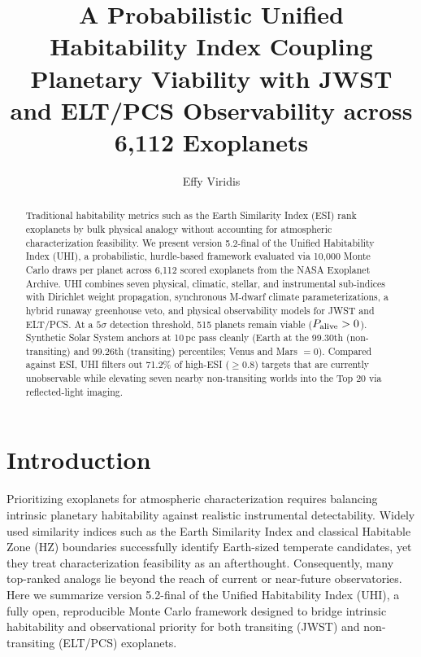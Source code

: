 \documentclass[linenumbers]{aastex702}
\begin{document}
\title{A Probabilistic Unified Habitability Index Coupling Planetary Viability with JWST and ELT/PCS Observability across 6,112 Exoplanets}

\author[0009-0004-5620-5352,gname=Effy,sname=Viridis]{Effy Viridis}

\begin{abstract}
Traditional habitability metrics such as the Earth Similarity Index (ESI) rank exoplanets by bulk physical analogy without accounting for atmospheric characterization feasibility. We present version 5.2-final of the Unified Habitability Index (UHI), a probabilistic, hurdle-based framework evaluated via 10,000 Monte Carlo draws per planet across 6,112 scored exoplanets from the NASA Exoplanet Archive. UHI combines seven physical, climatic, stellar, and instrumental sub-indices with Dirichlet weight propagation, synchronous M-dwarf climate parameterizations, a hybrid runaway greenhouse veto, and physical observability models for JWST and ELT/PCS. At a $5\sigma$ detection threshold, 515 planets remain viable ($P_{\rm alive} > 0$). Synthetic Solar System anchors at 10\,pc pass cleanly (Earth at the 99.30th (non-transiting) and 99.26th (transiting) percentiles; Venus and Mars $= 0$). Compared against ESI, UHI filters out 71.2\% of high-ESI ($\geq 0.8$) targets that are currently unobservable while elevating seven nearby non-transiting worlds into the Top 20 via reflected-light imaging.
\end{abstract}


\section{Introduction}

Prioritizing exoplanets for atmospheric characterization requires balancing intrinsic planetary habitability against realistic instrumental detectability. Widely used similarity indices such as the Earth Similarity Index \citep[ESI;][]{SchulzeMakuch2011} and classical Habitable Zone (HZ) boundaries \citep{Kopparapu2013,Kopparapu2014} successfully identify Earth-sized temperate candidates, yet they treat characterization feasibility as an afterthought. Consequently, many top-ranked analogs lie beyond the reach of current or near-future observatories. Here we summarize version 5.2-final of the Unified Habitability Index (UHI), a fully open, reproducible Monte Carlo framework designed to bridge intrinsic habitability and observational priority for both transiting (JWST) and non-transiting (ELT/PCS) exoplanets.
\end{document}
